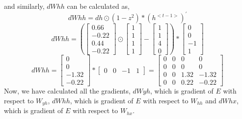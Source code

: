 \documentclass[12pt,letterpaper]{article}
\begin{document}
and similarly, $dWhh$ can be calculated as,
\[
dWhh = dh\odot(1-z^{2})*(h^{<t-1>})^{'}
\]
\[
dWhh = (\begin{bmatrix}
0.66\\
-0.22\\
0.44\\
-0.22
\end{bmatrix}\odot\begin{bmatrix}
1\\1\\1\\1
\end{bmatrix}-\begin{bmatrix}
1\\1\\4\\0
\end{bmatrix})*\begin{bmatrix}
0\\0\\-1\\1
\end{bmatrix}
\]
\[
dWhh =  \begin{bmatrix}
0\\0\\-1.32\\-0.22
\end{bmatrix}*\begin{bmatrix}
0&0&-1&1
\end{bmatrix} = \begin{bmatrix}
0&0&0&0\\
0&0&0&0\\
0&0&1.32&-1.32\\
0&0&0.22&-0.22
\end{bmatrix}
\]
Now, we have calculated all the gradients, $dWyh$, which is gradient of $E$ with respect to $W_{yh}$,  $dWhh$, which is gradient of $E$ with respect to $W_{hh}$ and
 $dWhx$, which is gradient of $E$ with respect to $W_{hx}$.
\end{document}

